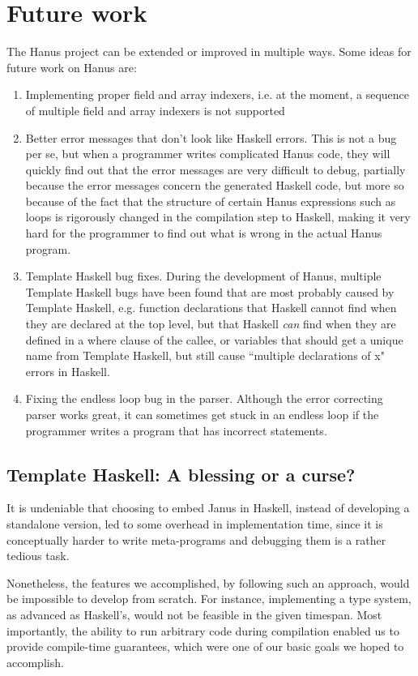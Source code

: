 \documentclass[12pt,a4paper]{article}
\begin{document}
\section{Future work}
	The Hanus project can be extended or improved in multiple ways. Some ideas for future work on Hanus are:
        \begin{enumerate}
                	\item Implementing proper field and array indexers, i.e. at the moment, a sequence of multiple field and array indexers is not supported
                	\item Better error messages that don't look like Haskell errors. This is not a bug per se, but when a programmer writes complicated Hanus code, they will quickly find out that the error messages are very difficult to debug, partially because the error messages concern the generated Haskell code, but more so because of the fact that the structure of certain Hanus expressions such as loops is rigorously changed in the compilation step to Haskell, making it very hard for the programmer to find out what is wrong in the actual Hanus program.
                	\item Template Haskell bug fixes. During the development of Hanus, multiple Template Haskell bugs have been found that are most probably caused by Template Haskell, e.g. function declarations that Haskell cannot find when they are declared at the top level, but that Haskell \emph{can} find when they are defined in a where clause of the callee, or variables that should get a unique name from Template Haskell, but still cause ``multiple declarations of x" errors in Haskell.
                	\item Fixing the endless loop bug in the parser. Although the error correcting parser works great, it can sometimes get stuck in an endless loop if the programmer writes a program that has incorrect statements.
        \end{enumerate}

	\subsection{Template Haskell: A blessing or a curse?}
It is undeniable that choosing to embed Janus in Haskell, instead of developing a standalone version, led to some overhead in implementation time, since it is conceptually harder to write meta-programs and debugging them is a rather tedious task.

Nonetheless, the features we accomplished, by following such an approach, would be impossible to develop from scratch. For instance, implementing a type system, as advanced as Haskell's, would not be feasible in the given timespan. Most importantly, the ability to run arbitrary code during compilation enabled us to provide compile-time guarantees, which were one of our basic goals we hoped to accomplish.
\end{document}

